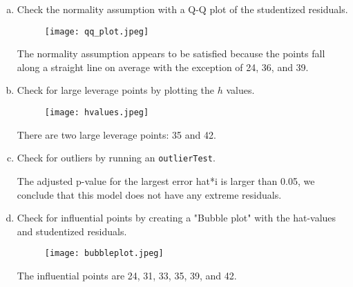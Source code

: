 \documentclass[12pt,letterpaper]{article}
\begin{document}
\begin{enumerate}[(a)]
	\item Check the normality assumption with a Q-Q plot of the studentized residuals. \vspace{1cm}
 
\begin{figure} [H]
	\texttt{[image: qq\_plot.jpeg]}
\end{figure}
\vspace{1cm}
\noindent The normality assumption appears to be satisfied because the points fall along a straight line on average with the exception of 24, 36, and 39.
\vspace{3cm}	
	\item Check for large leverage points by plotting the $h$ values. \vspace{1cm}
 
\begin{figure} [H]
	\texttt{[image: hvalues.jpeg]}
\end{figure}
\vspace{1cm}
\noindent There are two large leverage points: 35 and 42.
\vspace{3cm}
	\item Check for outliers by running an \texttt{outlierTest}. \vspace{1cm}
 
\vspace{1cm}
\noindent The adjusted p-value for the largest error hat*i is larger than 0.05, we conclude that this model does not have any extreme residuals.
\vspace{3cm}	
	\item Check for influential points by creating a "Bubble plot" with the hat-values and studentized residuals.
 
\begin{figure} [H]
	\texttt{[image: bubbleplot.jpeg]}
\end{figure}
\vspace{1cm}
\noindent The influential points are 24, 31, 33, 35, 39, and 42.

\end{enumerate}
\end{document}
